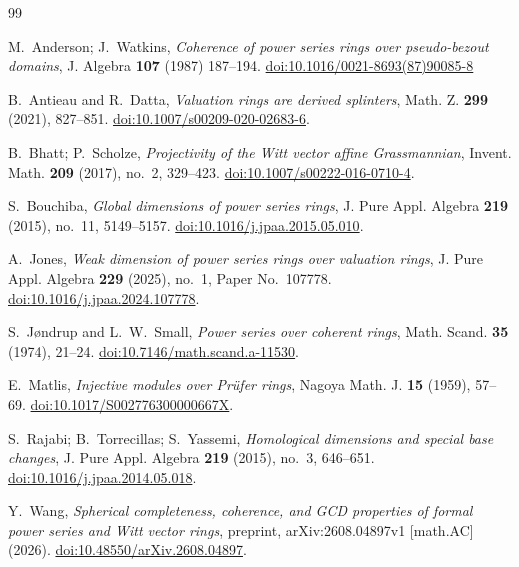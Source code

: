\documentclass[12pt]{amsart}
\theoremstyle{plain}
\begin{document}
\begingroup
\sloppy
{}
\begin{thebibliography}{99}

M.~Anderson; J.~Watkins,
\emph{Coherence of power series rings over pseudo-bezout domains}, 
J. Algebra \textbf{107} (1987) 187–194.
\href{https://doi.org/10.1016/0021-8693(87)90085-8}{doi:10.1016/0021-8693(87)90085-8}

B.~Antieau and R.~Datta,
\emph{Valuation rings are derived splinters},
Math. Z. \textbf{299} (2021), 827--851.
\href{https://doi.org/10.1007/s00209-020-02683-6}{doi:10.1007/s00209-020-02683-6}.

B.~Bhatt; P.~Scholze,
\emph{Projectivity of the Witt vector affine Grassmannian},
Invent. Math. \textbf{209} (2017), no.~2, 329--423.
\href{https://doi.org/10.1007/s00222-016-0710-4}
{doi:10.1007/s00222-016-0710-4}.

S.~Bouchiba,
\emph{Global dimensions of power series rings},
J. Pure Appl. Algebra \textbf{219} (2015), no.~11, 5149--5157.
\href{https://doi.org/10.1016/j.jpaa.2015.05.010}{doi:10.1016/j.jpaa.2015.05.010}.

A.~Jones,
\emph{Weak dimension of power series rings over valuation rings},
J. Pure Appl. Algebra \textbf{229} (2025), no.~1, Paper No.~107778.
\href{https://doi.org/10.1016/j.jpaa.2024.107778}{doi:10.1016/j.jpaa.2024.107778}.

S.~J{\o}ndrup and L.~W.~Small,
\emph{Power series over coherent rings},
Math. Scand. \textbf{35} (1974), 21--24.
\href{https://doi.org/10.7146/math.scand.a-11530}{doi:10.7146/math.scand.a-11530}.

E.~Matlis,
\emph{Injective modules over Pr\"ufer rings},
Nagoya Math. J. \textbf{15} (1959), 57--69.
\href{https://doi.org/10.1017/S002776300000667X}
{doi:10.1017/S002776300000667X}.

S.~Rajabi; B.~Torrecillas; S.~Yassemi,
\emph{Homological dimensions and special base changes},
J. Pure Appl. Algebra \textbf{219} (2015), no.~3, 646--651.
\href{https://doi.org/10.1016/j.jpaa.2014.05.018}{doi:10.1016/j.jpaa.2014.05.018}.

Y.~Wang,
\emph{Spherical completeness, coherence, and GCD properties of formal
power series and Witt vector rings},
preprint, arXiv:2608.04897v1 [math.AC] (2026).
\href{https://doi.org/10.48550/arXiv.2608.04897}{doi:10.48550/arXiv.2608.04897}.

\end{thebibliography}
\endgroup
\end{document}
